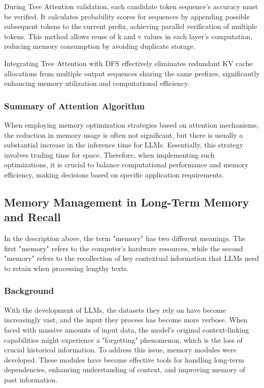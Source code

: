 \documentclass[conference]{IEEEtran}
\begin{document}
During Tree Attention validation, each candidate token sequence's accuracy must be verified. It calculates probability scores for sequences by appending possible subsequent tokens to the current prefix, achieving parallel verification of multiple tokens. This method allows reuse of k and v values in each layer's computation, reducing memory consumption by avoiding duplicate storage.

Integrating Tree Attention with DFS effectively eliminates redundant KV cache allocations from multiple output sequences sharing the same prefixes, significantly enhancing memory utilization and computational efficiency.

\subsubsection{Summary of Attention Algorithm}
When employing memory optimization strategies based on attention mechanisms, the reduction in memory usage is often not significant, but there is usually a substantial increase in the inference time for LLMs. Essentially, this strategy involves trading time for space. Therefore, when implementing such optimizations, it is crucial to balance computational performance and memory efficiency, making decisions based on specific application requirements.

\subsection{Memory Management in Long-Term Memory and Recall}
In the description above, the term "memory" has two different meanings. The first "memory" refers to the computer's hardware resources, while the second "memory" refers to the recollection of key contextual information that LLMs need to retain when processing lengthy texts.
\subsubsection{Background}
With the development of LLMs, the datasets they rely on have become increasingly vast, and the input they process has become more verbose. When faced with massive amounts of input data, the model's original context-linking capabilities might experience a "forgetting" phenomenon, which is the loss of crucial historical information. To address this issue, memory modules were developed. These modules have become effective tools for handling long-term dependencies, enhancing understanding of context, and improving memory of past information.
\end{document}
